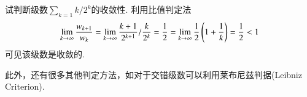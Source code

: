 \begin{examplebox}{试判断级数$\sum_{k=1} k/2^k$的收敛性.}
    利用比值判定法
    \[ 
        \lim_{k\to \infty} \frac{w_{k+1}}{w_k}=\lim_{k\to \infty} \frac{k+1}{2^{k+1}} / \frac{k}{2^{k}}=\frac{1}{2} 
        = \lim_{k\to \infty} \frac{1}{2}\left(1+\frac{1}{k}\right) 
        = {\frac{1}{2}} < 1
    \]
    可见该级数是收敛的.
\end{examplebox}

此外，还有很多其他判定方法，如对于交错级数可以利用莱布尼兹判据(Leibniz Criterion).
